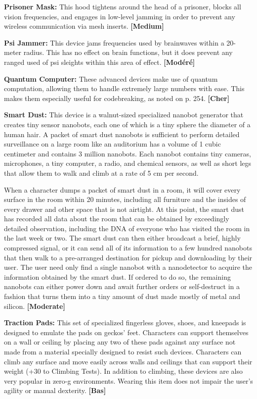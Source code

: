 {{\textbf{Prisoner Mask: }This hood tightens around the head of a prisoner, blocks all vision frequencies, and engages in low-level jamming in order to prevent any wireless communication via mesh inserts. \textbf{[Medium]} 

\textbf{Psi Jammer:} This device jams frequencies used by brainwaves within a 20-meter radius. This has no effect on brain functions, but it does prevent any ranged used of psi sleights within this area of effect. \textbf{[Modéré]} 

\textbf{Quantum Computer:} These advanced devices make use of quantum computation, allowing them to handle extremely large numbers with ease. This makes them especially useful for codebreaking, as noted on p. 254. \textbf{[Cher]} 

\textbf{Smart Dust:} This device is a walnut-sized specialized nanobot generator that creates tiny sensor nanobots, each one of which is a tiny sphere the diameter of a human hair. A packet of smart dust nanobots is sufficient to perform detailed surveillance on a large room like an auditorium has a volume of 1 cubic centimeter and contains 3 million nanobots. Each nanobot contains tiny cameras, microphones, a tiny computer, a radio, and chemical sensors, as well as short legs that allow them to walk and climb at a rate of 5 cm per second. 

When a character dumps a packet of smart dust in a room, it will cover every surface in the room within 20 minutes, including all furniture and the insides of every drawer and other space that is not airtight. At this point, the smart dust has recorded all data about the room that can be obtained by exceedingly detailed observation, including the DNA of everyone who has visited the room in the last week or two. The smart dust can then either broadcast a brief, highly compressed signal, or it can send all of its information to a few hundred nanobots that then walk to a pre-arranged destination for pickup and downloading by their user. The user need only find a single nanobot with a nanodetector to acquire the information obtained by the smart dust. If ordered to do so, the remaining nanobots can either power down and await further orders or self-destruct in a fashion that turns them into a tiny amount of dust made mostly of metal and silicon. \textbf{[Moderate]} 

\textbf{Traction Pads:} This set of specialized fingerless gloves, shoes, and kneepads is designed to emulate the pads on geckos’ feet. Characters can support themselves on a wall or ceiling by placing any two of these pads against any surface not made from a material specially designed to resist such devices. Characters can climb any surface and move easily across walls and ceilings that can support their weight (+30 to Climbing Tests). In addition to climbing, these devices are also very popular in zero-g environments. Wearing this item does not impair the user’s agility or manual dexterity. \textbf{[Bas]} 

}}
